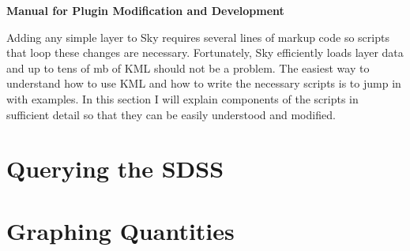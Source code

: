 \documentclass[12pt]{article}
\begin{document}
\vspace*{-.7in}
\vspace{.7in}
\centerline{\large\bf Manual for Plugin Modification and Development}
\vspace{.2in}




Adding any simple layer to Sky requires several lines of markup code so scripts that loop these changes are necessary. Fortunately, Sky efficiently loads layer data and up to tens of mb of KML should not be a problem. The easiest way to understand how to use KML and how to write the necessary scripts is to jump in with examples. In this section I will explain components of the scripts in sufficient detail so that they can be easily understood and modified. 
\section*{Querying the SDSS}

\section*{Graphing Quantities}
\end{document}
